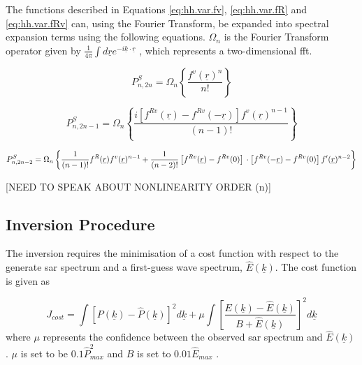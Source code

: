 The functions described in Equations \ref{eq:hh.var.fv}, \ref{eq:hh.var.fR} and \ref{eq:hh.var.fRv} can, using the Fourier Transform, be expanded into spectral expansion terms using the following equations. $\Omega_n$ is the Fourier Transform operator given by $\frac{1}{4\pi}\int d\underline{r}e^{-i\underline{k}\cdot \underline{r}}$ \cite{Hasselmann1991}, which represents a two-dimensional \ac{fft}.

\begin{equation} \label{eq:hh.ft.2n}
    P^S_{n,2n} = \Omega_n \left \{ \frac{f^v(\underline{r})^n}{n!} \right \}
\end{equation}

\begin{equation} \label{eq:hh.ft.2n-1}
    P^S_{n,2n-1} = \Omega_n \left \{ \frac{i\left [ f^{Rv}(\underline{r}) - f^{Rv}(-\underline{r}) \right ] f^v(\underline{r})^{n-1}}{(n-1)!} \right \}
\end{equation}

\begin{equation} \label{eq:hh.ft.2n-2}
    P^S_{n,2n-2} = \Omega_n \left \{ \frac{1}{(n-1)!} f^R(\underline{r}) f^v(\underline{r})^{n-1} + \frac{1}{(n-2)!} \left [ f^{Rv}(\underline{r}) - f^{Rv}(0) \right ] \\ 
    \cdot \left [ f^{Rv}(-\underline{r}) - f^{Rv}(0) \right ] f'(\underline{r})^{n-2}  \right \}
\end{equation}

[NEED TO SPEAK ABOUT NONLINEARITY ORDER (n)]

\subsection{Inversion Procedure} \label{subsec:theory.hasselmann.inversion}
The inversion requires the minimisation of a cost function \cite{Hasselmann1991} with respect to the generate \acs{sar} spectrum and a first-guess wave spectrum, $\hat{E}(\underline{k})$. The cost function is given as

\begin{equation} \label{eq:hh.inversion.J}
    J_{cost} = \int \left [ P(\underline{k}) - \hat{P}(\underline{k}) \right ]^2 d\underline{k} + \mu \int \left [ \frac{ E(\underline{k}) - \hat{E}(\underline{k})}{B+\hat{E}(\underline{k})} \right ]^2d\underline{k}
\end{equation}
where $\mu$ represents the confidence between the observed \acs{sar} spectrum and $\hat{E}(\underline{k})$. $\mu$ is set to be $0.1\hat{P}_{max}^2$ and $B$ is set to $0.01\hat{E}_{max}$ \cite{Hasselmann1991}. 

